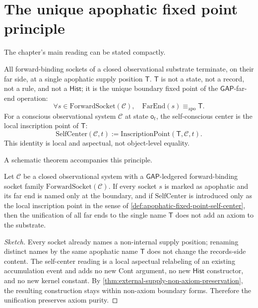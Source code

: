 \section{The unique apophatic fixed point principle}
\label{sec:apophatic-fixed-point-principle}

The chapter's main reading can be stated compactly.

\begin{principle}
\label{prin:apophatic-fixed-point-main}
All forward-binding sockets of a closed observational substrate terminate, on their far side, at a single apophatic supply position $\mathsf{T}$. $\mathsf{T}$ is not a state, not a record, not a rule, and not a $\mathsf{Hist}$; it is the unique boundary fixed point of the $\mathsf{GAP}$-far-end operation:
$$
\forall s \in \mathrm{ForwardSocket}(\mathcal{C}),\quad \mathrm{FarEnd}(s) \equiv_{\mathrm{apo}} \mathsf{T}.
$$
For a conscious observational system $\mathcal{C}$ at state $\mathsf{o}_t$, the self-conscious center is the local inscription point of $\mathsf{T}$:
$$
\mathrm{SelfCenter}(\mathcal{C}, t) := \mathrm{InscriptionPoint}(\mathsf{T}, \mathcal{C}, t).
$$
This identity is local and aspectual, not object-level equality.
\end{principle}

A schematic theorem accompanies this principle.

\begin{theorem}
\label{thm:apophatic-fixed-point-axiom-purity}
Let $\mathcal{C}$ be a closed observational system with a $\mathsf{GAP}$-ledgered forward-binding socket family $\mathrm{ForwardSocket}(\mathcal{C})$. If every socket $s$ is marked as apophatic and its far end is named only at the boundary, and if $\mathrm{SelfCenter}$ is introduced only as the local inscription point in the sense of \autoref{def:apophatic-fixed-point-self-center}, then the unification of all far ends to the single name $\mathsf{T}$ does not add an axiom to the substrate.
\end{theorem}

\begin{proof}[Sketch]
Every socket already names a non-internal supply position; renaming distinct names by the same apophatic name $\mathsf{T}$ does not change the records-side content. The self-center reading is a local aspectual relabeling of an existing accumulation event and adds no new Cont argument, no new $\mathsf{Hist}$ constructor, and no new kernel constant. By \autoref{thm:external-supply-non-axiom-preservation}, the resulting construction stays within non-axiom boundary forms. Therefore the unification preserves axiom purity.
\end{proof}


